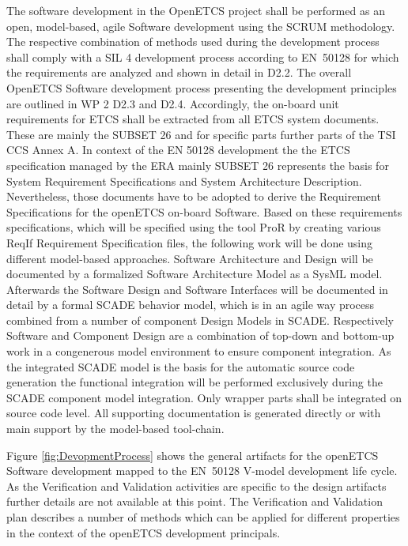 \documentclass{template/openetcs_report}
\begin{document}
The software development in the OpenETCS project shall be performed as an open, model-based, agile Software development using the SCRUM methodology. The respective combination of methods used during the development process shall comply with a SIL 4 development process according to EN~50128 for which the requirements are analyzed and shown in detail in D2.2. The overall OpenETCS Software development process presenting the development principles are outlined in WP 2 D2.3 and D2.4. Accordingly, the on-board unit requirements for ETCS shall be extracted from all ETCS system documents. These are mainly the SUBSET 26  and for specific parts further parts of the TSI CCS Annex A. In context of the EN 50128 development the the ETCS specification managed by the ERA mainly SUBSET 26 represents the basis for System Requirement Specifications and System Architecture Description. Nevertheless, those documents have to be adopted to derive the Requirement Specifications for the openETCS on-board Software. Based on these requirements specifications, which will be specified using the tool ProR by creating various ReqIf Requirement Specification files, the following work will be done using different model-based approaches. Software Architecture and Design will be documented by a formalized Software Architecture Model as a SysML  model. Afterwards the Software Design and Software Interfaces will be documented in detail by a formal SCADE behavior model, which is in an agile way process combined from a number of component Design Models in SCADE. Respectively Software and Component Design are a combination of top-down and bottom-up work in a congenerous model environment to ensure component integration. As the integrated SCADE model is the basis for the automatic source code generation the functional integration will be performed exclusively during the SCADE component model integration. Only wrapper parts shall be integrated on source code level. All supporting documentation is generated directly or with main support by the model-based tool-chain.

Figure \ref{fig:DevopmentProcess} shows the general artifacts for the openETCS Software development mapped to the EN~50128 V-model development life cycle. As the Verification and Validation activities are specific to the design artifacts further details are not available at this point. The Verification and Validation plan describes a number of methods which can be applied for different properties in the context of the openETCS development principals.
\end{document}
